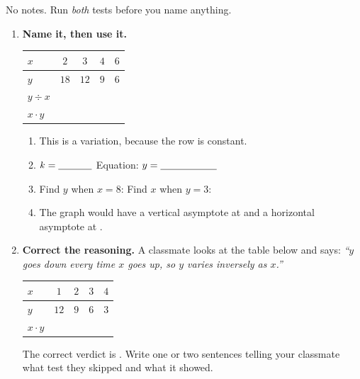 \documentclass[10pt]{article}
\begin{document}
\namedateperiod

\vspace{0.06in}

No notes. Run \emph{both} tests before you name anything.

\vspace{0.04in}

\begin{enumerate}[leftmargin=1.8em, itemsep=9pt]
  \item \textbf{Name it, then use it.}
    \begin{center}
    \renewcommand{\arraystretch}{1.25}
    \begin{tabular}{|l|c|c|c|c|}
    \hline
    \rowcolor{forestbg}
    $x$ & $2$ & $3$ & $4$ & $6$ \\ \hline
    $y$ & $18$ & $12$ & $9$ & $6$ \\ \hline
    $y\div x$ & & & & \\ \hline
    $x\cdot y$ & & & & \\ \hline
    \end{tabular}
    \end{center}
    \vspace{-2pt}
    \begin{enumerate}[label=(\alph*), leftmargin=2.1em, itemsep=4pt]
      \item This is a \blank{2.2cm} variation, because the \blank{2.0cm} row is constant.
      \item $k=\blank{1.2cm}$ \quad Equation: $y=\blank{2.0cm}$
      \item Find $y$ when $x=8$: \blank{1.6cm} \quad Find $x$ when $y=3$: \blank{1.6cm}
      \item The graph would have a vertical asymptote at \blank{1.6cm} and a horizontal asymptote
            at \blank{1.6cm}.
    \end{enumerate}

  \item \textbf{Correct the reasoning.} A classmate looks at the table below and says: \emph{``$y$ goes
        down every time $x$ goes up, so $y$ varies inversely as $x$.''}
    \begin{center}
    \renewcommand{\arraystretch}{1.25}
    \begin{tabular}{|l|c|c|c|c|}
    \hline
    \rowcolor{forestbg}
    $x$ & $1$ & $2$ & $3$ & $4$ \\ \hline
    $y$ & $12$ & $9$ & $6$ & $3$ \\ \hline
    $x\cdot y$ & & & & \\ \hline
    \end{tabular}
    \end{center}
    \vspace{-2pt}
    The correct verdict is \blank{2.2cm}. Write one or two sentences telling your classmate what test
    they skipped and what it showed. 


\end{enumerate}
\end{document}
